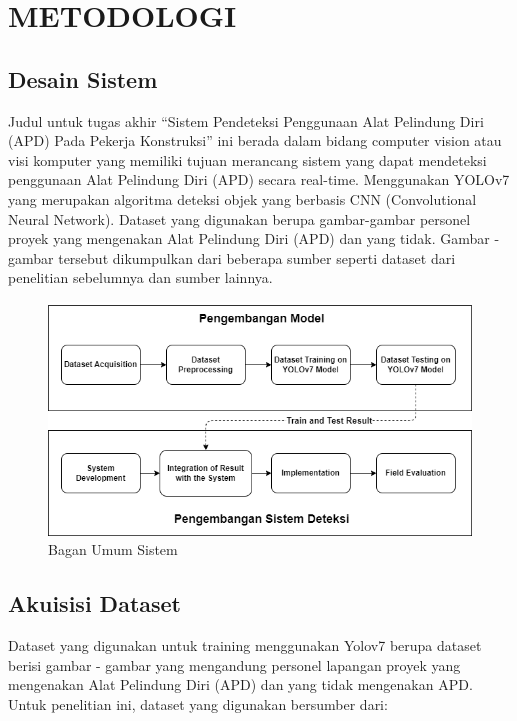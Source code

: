 
\section{METODOLOGI}


\subsection{Desain Sistem}
\label{sec:desainsistem}

Judul untuk tugas akhir “Sistem Pendeteksi Penggunaan Alat Pelindung Diri (APD) Pada Pekerja Konstruksi” ini berada dalam bidang computer vision atau visi komputer yang memiliki tujuan merancang sistem yang dapat mendeteksi penggunaan Alat Pelindung Diri (APD) secara real-time. Menggunakan YOLOv7 yang merupakan algoritma deteksi objek yang berbasis CNN (Convolutional Neural Network). Dataset yang digunakan berupa gambar-gambar personel proyek yang mengenakan Alat Pelindung Diri (APD) dan yang tidak. Gambar - gambar tersebut dikumpulkan dari beberapa sumber seperti dataset dari penelitian sebelumnya dan sumber lainnya.

\begin{figure}[ht]
  \centering
  \includegraphics[width=1.0\textwidth]{gambar/desain_sistem.png}
  \caption{Bagan Umum Sistem}
  \label{fig:baganumumsistem}
\end{figure}

\newpage

\subsection{Akuisisi Dataset}
\label{sec:akuisisidataset}

Dataset yang digunakan untuk training menggunakan Yolov7 berupa dataset berisi gambar - gambar yang mengandung personel lapangan proyek yang mengenakan Alat Pelindung Diri (APD) dan yang tidak mengenakan APD. Untuk penelitian ini, dataset yang digunakan bersumber dari:

